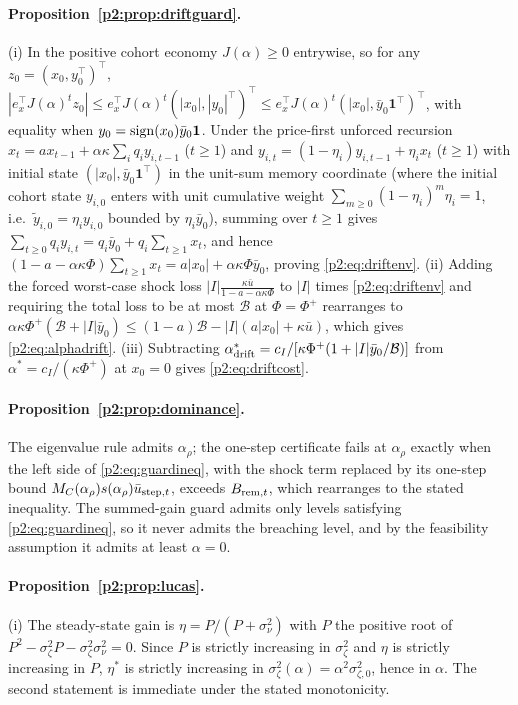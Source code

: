 \paragraph{Proposition~\ref{p2:prop:driftguard}.} (i) In the positive cohort economy $J(\alpha)\ge0$ entrywise, so for any $z_0=(x_0,y_0^\top)^\top$, $|e_x^\top J(\alpha)^t z_0|\le e_x^\top J(\alpha)^t(|x_0|,|y_0|^\top)^\top\le e_x^\top J(\alpha)^t(|x_0|,\bar y_0\mathbf{1}^\top)^\top$, with equality when $y_0={\rm sign}(x_0)\bar y_0\mathbf{1}$. Under the price-first unforced recursion $x_t=a x_{t-1}+\alpha\kappa\sum_i q_i y_{i,t-1}$ ($t\ge1$) and $y_{i,t}=(1-\eta_i)y_{i,t-1}+\eta_i x_t$ ($t\ge1$) with initial state $(|x_0|,\bar y_0\mathbf{1}^\top)$ in the unit-sum memory coordinate (where the initial cohort state $y_{i,0}$ enters with unit cumulative weight $\sum_{m\ge0}(1-\eta_i)^m\eta_i=1$, i.e.\ $\tilde y_{i,0}=\eta_i y_{i,0}$ bounded by $\eta_i\bar y_0$), summing over $t\ge1$ gives $\sum_{t\ge0}q_i y_{i,t}=q_i\bar y_0+q_i\sum_{t\ge1}x_t$, and hence $(1-a-\alpha\kappa\Phi)\sum_{t\ge1}x_t=a|x_0|+\alpha\kappa\Phi\bar y_0$, proving \eqref{p2:eq:driftenv}. (ii) Adding the forced worst-case shock loss $|I|\frac{\kappa\bar u}{1-a-\alpha\kappa\Phi}$ to $|I|$ times \eqref{p2:eq:driftenv} and requiring the total loss to be at most $\mathcal B$ at $\Phi=\Phi^+$ rearranges to $\alpha\kappa\Phi^+(\mathcal B+|I|\bar y_0)\le(1-a)\mathcal B-|I|(a|x_0|+\kappa\bar u)$, which gives \eqref{p2:eq:alphadrift}. (iii) Subtracting $\alpha_{\rm drift}^*=c_I/[\kappa\Phi^+(1+|I|\bar y_0/\mathcal B)]$ from $\alpha^*=c_I/(\kappa\Phi^+)$ at $x_0=0$ gives \eqref{p2:eq:driftcost}.

\paragraph{Proposition~\ref{p2:prop:dominance}.} The eigenvalue rule admits $\alpha_\rho$; the one-step certificate fails at $\alpha_\rho$ exactly when the left side of \eqref{p2:eq:guardineq}, with the shock term replaced by its one-step bound $M_C(\alpha_\rho)s(\alpha_\rho)\bar u_{{\rm step},t}$, exceeds $B_{{\rm rem},t}$, which rearranges to the stated inequality. The summed-gain guard admits only levels satisfying \eqref{p2:eq:guardineq}, so it never admits the breaching level, and by the feasibility assumption it admits at least $\alpha=0$.

\paragraph{Proposition~\ref{p2:prop:lucas}.} (i) The steady-state gain is $\eta=P/(P+\sigma_\nu^2)$ with $P$ the positive root of $P^2-\sigma_\zeta^2P-\sigma_\zeta^2\sigma_\nu^2=0$. Since $P$ is strictly increasing in $\sigma_\zeta^2$ and $\eta$ is strictly increasing in $P$, $\eta^*$ is strictly increasing in $\sigma_\zeta^2(\alpha)=\alpha^2\sigma_{\zeta,0}^2$, hence in $\alpha$. The second statement is immediate under the stated monotonicity.


